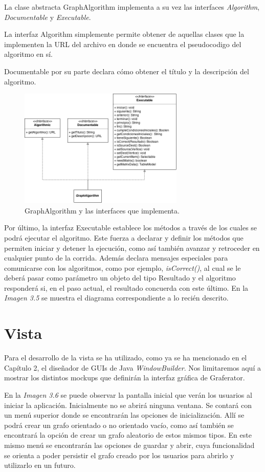 \documentclass{book}
\begin{document}
La clase abstracta GraphAlgorithm implementa a su vez las interfaces \textit{Algorithm}, \textit{Documentable} y \textit{Executable}. 
\par
La interfaz Algorithm simplemente permite obtener de aquellas clases que la implementen la URL del archivo en donde se encuentra el pseudocodigo del algoritmo en sí.
\par
Documentable por su parte declara cómo obtener el título y la descripción del algoritmo.
\bigskip


\begin{figure}[H]
	\centering
	\includegraphics[width=0.70\textwidth]{images/01-02.png}
	\medskip
	\caption{GraphAlgorithm y las interfaces que implementa.}
	\medskip
\end{figure}
\bigskip

Por último, la interfaz Executable establece los métodos a través de los cuales se podrá ejecutar el algoritmo. Este fuerza a declarar y definir los métodos que permiten iniciar y detener la ejecución, como así también avanzar y retroceder en cualquier punto de la corrida. Además declara mensajes especiales para comunicarse con los algoritmos, como por ejemplo, \textit{isCorrect()}, al cual se le deberá pasar como parámetro un objeto del tipo Resultado y el algoritmo responderá si, en el paso actual, el resultado concuerda con este último. En la \textit{Imagen 3.5} se muestra el diagrama correspondiente a lo recién descrito.
\bigskip


\section{Vista}

Para el desarrollo de la vista se ha utilizado, como ya se ha mencionado en el Capítulo 2, el diseñador de GUIs de Java \textit{WindowBuilder}. Nos limitaremos aquí a mostrar los distintos mockups que definirán la interfaz gráfica de Graferator.
\par
En la \textit{Imagen 3.6} se puede observar la pantalla inicial que verán los usuarios al iniciar la aplicación. Inicialmente no se abrirá ninguna ventana. Se contará con un menú superior donde se encontrarán las opciones de inicialización. Allí se podrá crear un grafo orientado o no orientado vacío, como así también se encontrará la opción de crear un grafo aleatorio de estos mismos tipos. En este mismo menú se encontrarán las opciones de guardar y abrir, cuya funcionalidad se orienta a poder persistir el grafo creado por los usuarios para abrirlo y utilizarlo en un futuro.
\bigskip
\end{document}
